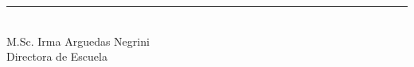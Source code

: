 \vspace{\baselineskip}
\vspace{\baselineskip}
\vspace{\baselineskip}
\noindent\rule{6cm}{0.5pt}\\
M.Sc. Irma Arguedas Negrini\\
Directora de Escuela\\
\newpage
